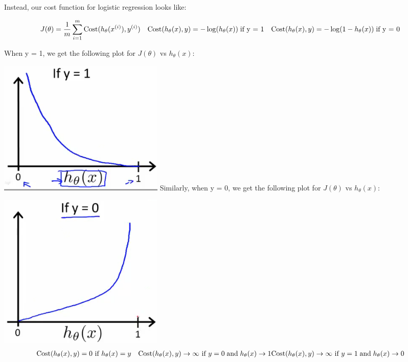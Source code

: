 \documentclass[
]{book}
\begin{document}
Instead, our cost function for logistic regression looks like:

\begin{align}& J(\theta) = \dfrac{1}{m} \sum_{i=1}^m \mathrm{Cost}(h_\theta(x^{(i)}),y^{(i)}) \newline & \mathrm{Cost}(h_\theta(x),y) = -\log(h_\theta(x)) \; & \text{if y = 1} \newline & \mathrm{Cost}(h_\theta(x),y) = -\log(1-h_\theta(x)) \; & \text{if y = 0}\end{align}

When y = 1, we get the following plot for \(J(\theta)\) vs \(h_\theta (x)\):

\includegraphics{LR_cost.png}
Similarly, when y = 0, we get the following plot for \(J(\theta)\) vs \(h_\theta (x)\):

\includegraphics{L.png}
\begin{align}& \mathrm{Cost}(h_\theta(x),y) = 0 \text{ if } h_\theta(x) = y \newline & \mathrm{Cost}(h_\theta(x),y) \rightarrow \infty \text{ if } y = 0 \; \mathrm{and} \; h_\theta(x) \rightarrow 1 \newline & \mathrm{Cost}(h_\theta(x),y) \rightarrow \infty \text{ if } y = 1 \; \mathrm{and} \; h_\theta(x) \rightarrow 0 \newline \end{align}
\end{document}

